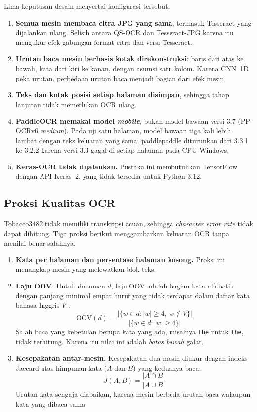 Lima keputusan desain menyertai konfigurasi tersebut:
\begin{enumerate}
  \item \textbf{Semua mesin membaca citra JPG yang sama}, termasuk Tesseract yang
  dijalankan ulang. Selisih antara QS-OCR dan Tesseract-JPG karena itu mengukur efek
  gabungan format citra dan versi Tesseract.
  \item \textbf{Urutan baca mesin berbasis kotak direkonstruksi}: baris dari atas ke
  bawah, kata dari kiri ke kanan, dengan asumsi satu kolom. Karena CNN~1D peka urutan,
  perbedaan urutan baca menjadi bagian dari efek mesin.
  \item \textbf{Teks dan kotak posisi setiap halaman disimpan}, sehingga tahap lanjutan
  tidak memerlukan OCR ulang.
  \item \textbf{PaddleOCR memakai model \textit{mobile}}, bukan model bawaan versi 3.7
  (PP-OCRv6 \textit{medium}). Pada uji satu halaman, model bawaan tiga kali lebih lambat
  dengan teks keluaran yang sama. paddlepaddle diturunkan dari 3.3.1 ke 3.2.2 karena
  versi 3.3 gagal di setiap halaman pada CPU Windows.
  \item \textbf{Keras-OCR tidak dijalankan.} Pustaka ini membutuhkan TensorFlow dengan API
  Keras~2, yang tidak tersedia untuk Python 3.12.
\end{enumerate}

\subsection{Proksi Kualitas OCR}\label{sec:proksi}

Tobacco3482 tidak memiliki transkripsi acuan, sehingga \textit{character error rate}
tidak dapat dihitung. Tiga proksi berikut menggambarkan keluaran OCR tanpa menilai
benar-salahnya.

\begin{enumerate}
  \item \textbf{Kata per halaman dan persentase halaman kosong.} Proksi ini menangkap
  mesin yang melewatkan blok teks.
  \item \textbf{Laju OOV.} Untuk dokumen $d$, laju OOV adalah bagian kata alfabetik dengan
  panjang minimal empat huruf yang tidak terdapat dalam daftar kata bahasa Inggris $V$
  \parencite{wordfreq}:
  \begin{equation}\label{eq:oov}
    \mathrm{OOV}(d) = \frac{\left|\{w \in d : |w| \geq 4,\; w \notin V\}\right|}
                           {\left|\{w \in d : |w| \geq 4\}\right|}
  \end{equation}
  Salah baca yang kebetulan berupa kata yang ada, misalnya \texttt{tbe} untuk
  \texttt{the}, tidak terhitung. Karena itu nilai ini adalah \emph{batas bawah} galat.
  \item \textbf{Kesepakatan antar-mesin.} Kesepakatan dua mesin diukur dengan indeks
  Jaccard atas himpunan kata ($A$ dan $B$) yang keduanya baca:
  \begin{equation}\label{eq:jaccard}
    J(A, B) = \frac{|A \cap B|}{|A \cup B|}
  \end{equation}
  Urutan kata sengaja diabaikan, karena mesin berbeda urutan baca walaupun kata yang
  dibaca sama.
\end{enumerate}

